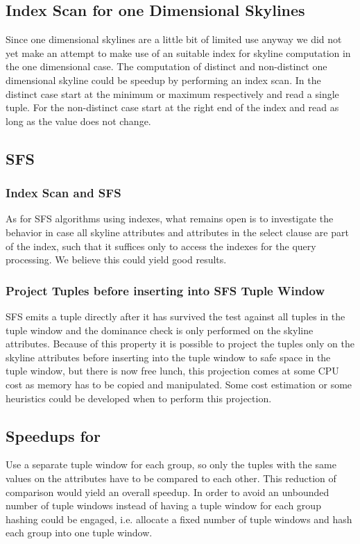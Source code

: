 \subsection{Index Scan for one Dimensional Skylines}
\label{sec:index-scan-for-1dim}
Since one dimensional skylines are a little bit of limited use anyway
we did not yet make an attempt to make use of an suitable index for
skyline computation in the one dimensional case. The computation of
distinct and non-distinct one dimensional skyline could be speedup by
performing an index scan. In the distinct case start at the minimum or
maximum respectively and read a single tuple. For the non-distinct case
start at the right end of the index and read as long as the value does
not change.


\subsection{SFS}
\subsubsection{Index Scan and SFS}
As for SFS algorithms using indexes, what remains open is to
investigate the behavior in case all skyline attributes and attributes
in the select clause are part of the index, such that it suffices only
to access the indexes for the query processing.  We believe this could
yield good results.


\subsubsection{Project Tuples before inserting into SFS Tuple Window}
SFS emits a tuple directly after it has survived the test against all
tuples in the tuple window and the dominance check is only performed
on the skyline attributes.  Because of this property it is possible to
project the tuples only on the skyline attributes before inserting
into the tuple window to safe space in the tuple window, but there is
now free lunch, this projection comes at some CPU cost as memory has
to be copied and manipulated.  Some cost estimation or some heuristics
could be developed when to perform this projection.


\subsection{Speedups for }
\label{sec:speedup-skyline-diff}
%
Use a separate tuple window for each 
group, so only the tuples with the same values on the
 attributes have to be compared to each
other. This reduction of comparison would yield an overall speedup.
In order to avoid an unbounded number of tuple windows instead of
having a tuple window for each  group
hashing could be engaged, i.e. allocate a fixed number of tuple
windows and hash each  group into one tuple
window.

